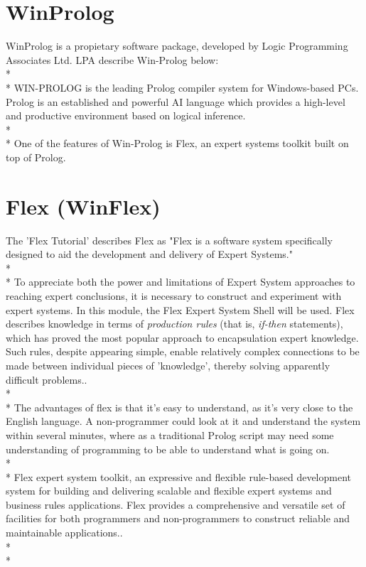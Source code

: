 \documentclass[12pt]{report}
\begin{document}
\section{WinProlog}\label{sec:winprolog}
WinProlog is a propietary software package, developed by Logic Programming Associates Ltd.  LPA describe Win-Prolog below:
\\*
\\*
WIN-PROLOG is the leading Prolog compiler system for Windows-based PCs. Prolog is an established and powerful AI language which provides a high-level and productive environment based on logical inference.\citep{lpawinprolog}
\\*
\\*
One of the features of Win-Prolog is Flex, an expert systems toolkit built on top of Prolog.

\section{Flex (WinFlex)}\label{sec:introflex}
The 'Flex Tutorial' describes Flex as "Flex is a software system specifically designed to aid the development and delivery of Expert Systems."
\\*
\\*
To appreciate both the power and limitations of Expert System approaches to reaching expert conclusions, it is necessary to construct and experiment with expert systems.  In this module, the Flex Expert System Shell will be used.  Flex describes knowledge in terms of \textit{production rules} (that is, \textit{if-then} statements), which has proved the most popular approach to encapsulation expert knowledge.  Such rules, despite appearing simple, enable relatively complex connections to be made between individual pieces of 'knowledge', thereby solving apparently difficult problems.\citep{flexsystems09}.
\\*
\\*
The advantages of flex is that it's easy to understand, as it's very close to the English language.  A non-programmer could look at it and understand the system within several minutes, where as a traditional Prolog script may need some understanding of programming to be able to understand what is going on.
\\*
\\*
Flex expert system toolkit, an expressive and flexible rule-based development system for building and delivering scalable and flexible expert systems and business rules applications. Flex provides a comprehensive and versatile set of facilities for both programmers and non-programmers to construct reliable and maintainable applications.\citep{lpawinprolog-flex}.
\\*
\\*
\end{document}
